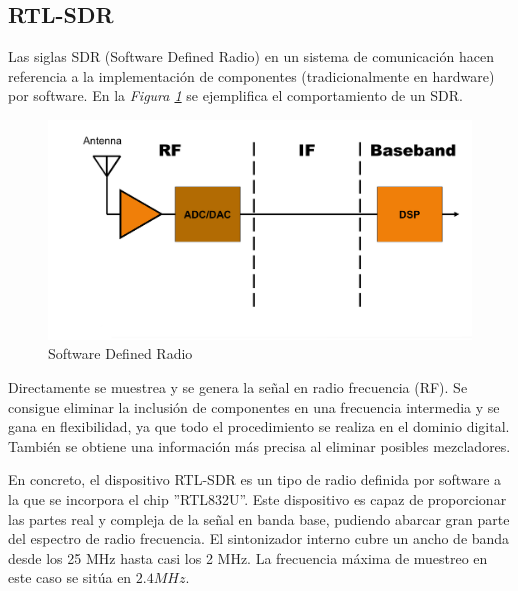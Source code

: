 \documentclass[a4paper,openright,12pt]{article}
\begin{document}
	\subsection{RTL-SDR}
	Las siglas SDR (Software Defined Radio) en un sistema de comunicación hacen referencia a la implementación de componentes (tradicionalmente en hardware) por software. En la \textit{Figura \ref{SDR}} se ejemplifica el comportamiento de un SDR.
	
 \begin{figure}[hbtp]
 \centering
 \includegraphics[width = 12cm]{imagenes/sdr.jpg}
 \caption{Software Defined Radio}
 \label{SDR}
 \end{figure}

Directamente se muestrea y se genera la señal en radio frecuencia (RF). Se consigue eliminar la inclusión de componentes en una frecuencia intermedia y se gana en flexibilidad, ya que todo el procedimiento se realiza en el dominio digital. También se obtiene una información más precisa al eliminar posibles mezcladores.

	 En concreto, el dispositivo RTL-SDR es un tipo de radio definida por software a la que se incorpora el chip ''RTL832U''. Este dispositivo es capaz de proporcionar las partes real y compleja de la señal en banda base, pudiendo abarcar gran parte del espectro de radio frecuencia. El sintonizador interno cubre un ancho de banda desde los 25 MHz hasta casi los 2 MHz. La frecuencia máxima de muestreo en este caso se sitúa en $2.4 MHz$.
	 
\end{document}
